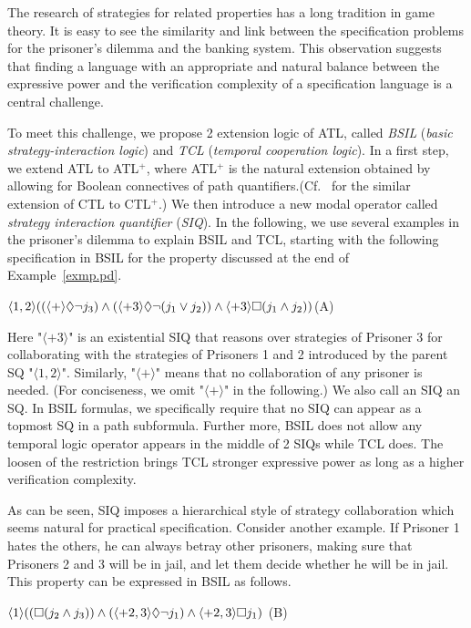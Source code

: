 The research of strategies for related properties has a long tradition in game theory.  
It is easy to see the similarity and link between the specification problems for the prisoner's dilemma and the banking system.
This observation suggests that finding a language with an appropriate and natural balance between the expressive power and the verification complexity of a specification language is a central challenge.

To meet this challenge, we propose 2 extension logic of ATL, called {\em BSIL} ({\em basic strategy-interaction logic}) and {\em TCL} ({\em temporal cooperation logic}).
In a first step, we extend ATL to ATL$^+$, where ATL$^+$ is the natural extension obtained by allowing for Boolean connectives of path quantifiers.(Cf.~\cite{BPM83,EC80} for the similar extension of CTL to CTL$^+$.)
We then introduce a new modal operator called {\em strategy interaction quantifier} ({\em SIQ}). 
In the following, we use several examples in the prisoner's dilemma to explain BSIL and TCL, starting with the following specification in BSIL for the property discussed at the end of Example~\ref{exmp.pd}.
\begin{center} 
\hfill $\langle 1,2\rangle((\langle+\rangle\Diamond\neg j_3)\wedge 
	(\langle +3\rangle \Diamond\neg (j_1\vee j_2))
	\wedge \langle+3\rangle \Box (j_1\wedge j_2))
$\hfill (A) 
\end{center} 
Here "$\langle+3\rangle$" is an existential SIQ that reasons over 
strategies of Prisoner 3 for collaborating with the strategies  
of Prisoners 1 and 2 introduced by the parent SQ "$\langle 1,2\rangle$". 
Similarly, "$\langle+\rangle$" means that no collaboration of any prisoner is needed. 
(For conciseness, we omit "$\langle+\rangle$" in the following.)
We also call an SIQ an SQ.  
In BSIL formulas, we specifically require that no SIQ can appear as a topmost SQ in a path subformula.
Further more, BSIL does not allow any temporal logic operator appears in the middle of 2 SIQs while TCL does.
The loosen of the restriction brings TCL stronger expressive power as long as a higher verification complexity.

As can be seen, SIQ imposes a hierarchical style of strategy collaboration which seems natural for practical specification.  
Consider another example.
If Prisoner 1 hates the others, he can always betray other prisoners, making sure that Prisoners 2 and 3 will be in jail, and let them decide whether he will be in jail.  
This property can be expressed in BSIL as follows. 
\begin{center} 
\hfill 
$\langle 1\rangle((\Box (j_2\wedge j_3))\wedge 
	(\langle +2,3\rangle \Diamond\neg j_1)
	\wedge \langle+2,3\rangle \Box j_1)
$
\hfill (B) 
\end{center} 

